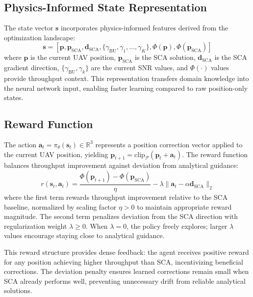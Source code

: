 \documentclass[journal]{IEEEtran}
\begin{document}
\subsection{Physics-Informed State Representation}

The state vector $\mathbf{s}$ incorporates physics-informed features derived from the optimization landscape:
\begin{equation}
\mathbf{s} = [\mathbf{p}, \mathbf{p}_{\text{SCA}}, \mathbf{d}_{\text{SCA}}, \{\gamma_{\text{BU}}, \gamma_1, \ldots, \gamma_K\}, \Phi(\mathbf{p}), \Phi(\mathbf{p}_{\text{SCA}})]
\label{eq:state}
\end{equation}
where $\mathbf{p}$ is the current UAV position, $\mathbf{p}_{\text{SCA}}$ is the SCA solution, $\mathbf{d}_{\text{SCA}}$ is the SCA gradient direction, $\{\gamma_{\text{BU}}, \gamma_k\}$ are the current SNR values, and $\Phi(\cdot)$ values provide throughput context. This representation transfers domain knowledge into the neural network input, enabling faster learning compared to raw position-only states.

\subsection{Reward Function}

The action $\mathbf{a}_t = \pi_\theta(\mathbf{s}_t) \in \mathbb{R}^3$ represents a position correction vector applied to the current UAV position, yielding $\mathbf{p}_{t+1} = \text{clip}_\mathcal{P}(\mathbf{p}_t + \mathbf{a}_t)$. The reward function balances throughput improvement against deviation from analytical guidance:
\begin{equation}
r(\mathbf{s}_t, \mathbf{a}_t) = \frac{\Phi(\mathbf{p}_{t+1}) - \Phi(\mathbf{p}_{\text{SCA}})}{\eta} - \lambda \|\mathbf{a}_t - \alpha\mathbf{d}_{\text{SCA}}\|_2
\label{eq:reward}
\end{equation}
where the first term rewards throughput improvement relative to the SCA baseline, normalized by scaling factor $\eta > 0$ to maintain appropriate reward magnitude. The second term penalizes deviation from the SCA direction with regularization weight $\lambda \geq 0$. When $\lambda = 0$, the policy freely explores; larger $\lambda$ values encourage staying close to analytical guidance.

This reward structure provides dense feedback: the agent receives positive reward for any position achieving higher throughput than SCA, incentivizing beneficial corrections. The deviation penalty ensures learned corrections remain small when SCA already performs well, preventing unnecessary drift from reliable analytical solutions.
\end{document}
